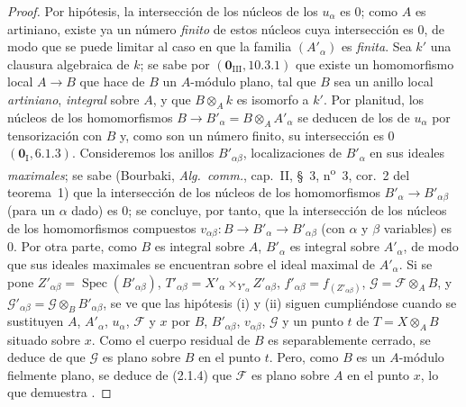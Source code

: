 \begin{proof}
Por hipótesis, la intersección de los núcleos de los $u_\alpha$ es $0$; como $A$ es artiniano,
existe ya un número \emph{finito} de estos núcleos cuya intersección es $0$, de modo que se puede
limitar al caso en que la familia $(A'_\alpha)$ es \emph{finita}. Sea $k'$ una clausura algebraica de $k$; se sabe
por $(\mathbf 0_{\mathrm{III}},10.3.1)$ que existe un homomorfismo local $A\to B$ que hace de $B$ un $A$-módulo plano,
tal que $B$ sea un anillo local \emph{artiniano}, \emph{integral} sobre $A$, y que $B\otimes_A k$ es isomorfo a $k'$.
Por planitud, los núcleos de los homomorfismos $B\to B'_\alpha=B\otimes_A A'_\alpha$ se deducen de los de
$u_\alpha$ por tensorización con $B$ y, como son un número finito, su intersección es
$0$ $(\mathbf 0_{\mathrm I},6.1.3)$. Consideremos los anillos $B'_{\alpha\beta}$, localizaciones de $B'_\alpha$ en sus ideales \emph{maximales};
se sabe (Bourbaki, \emph{Alg.\ comm.}, cap.~II, \S~3, n\textsuperscript{o}~3, cor.~2 del teorema~1) que la intersección
de los núcleos de los homomorfismos $B'_\alpha\to B'_{\alpha\beta}$ (para un $\alpha$ dado) es $0$; se concluye, por tanto,
que la intersección de los núcleos de los homomorfismos compuestos $v_{\alpha\beta}:B\to B'_\alpha\to B'_{\alpha\beta}$ (con $\alpha$ y
$\beta$ variables) es $0$. Por otra parte, como $B$ es integral sobre $A$, $B'_\alpha$ es integral sobre $A'_\alpha$,
de modo que sus ideales maximales se encuentran sobre el ideal maximal de $A'_\alpha$. Si se pone
$Z'_{\alpha\beta}=\operatorname{Spec}(B'_{\alpha\beta})$,
$T'_{\alpha\beta}=X'_\alpha\times_{Y'_\alpha}Z'_{\alpha\beta}$,
$f'_{\alpha\beta}=f_{(Z'_{\alpha\beta})}$,
$\mathcal G=\mathcal F\otimes_A B$, y
$\mathcal G'_{\alpha\beta}=\mathcal G\otimes_B B'_{\alpha\beta}$, se ve
que las hipótesis (i) y (ii) siguen cumpliéndose cuando se sustituyen
$A$, $A'_\alpha$, $u_\alpha$, $\mathcal F$ y $x$ por $B$, $B'_{\alpha\beta}$, $v_{\alpha\beta}$, $\mathcal G$ y un punto $t$ de $T=X\otimes_A B$ situado sobre $x$.
Como el cuerpo residual de $B$ es separablemente cerrado, se deduce de  que
$\mathcal G$ es plano sobre $B$ en el punto $t$. Pero, como $B$ es un $A$-módulo fielmente plano, se deduce de (2.1.4)
que $\mathcal F$ es plano sobre $A$ en el punto $x$, lo que demuestra .
\end{proof}


